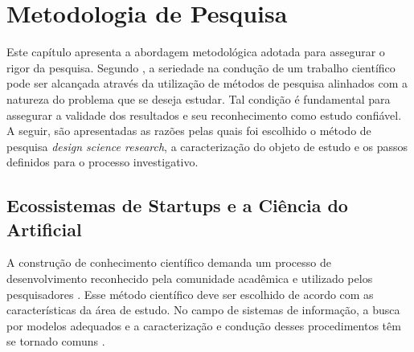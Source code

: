 \chapter{Metodologia de Pesquisa}\label{cap5}




Este capítulo apresenta a abordagem metodológica adotada para assegurar o rigor da pesquisa. Segundo , a seriedade na condução de um trabalho científico pode ser alcançada através da utilização de métodos de pesquisa alinhados com a natureza do problema que se deseja estudar. Tal condição é fundamental para assegurar a validade dos resultados e seu reconhecimento como estudo confiável. A seguir, são apresentadas as razões pelas quais foi escolhido o método de pesquisa \textit{design science research}, a caracterização do objeto de estudo e os passos definidos para o processo investigativo.

\section{Ecossistemas de Startups e a Ciência do Artificial}
A construção de conhecimento científico demanda um processo de desenvolvimento reconhecido pela comunidade acadêmica e utilizado pelos pesquisadores \cite{kuhn:2003}. Esse método científico deve ser escolhido de acordo com as características da área de estudo. No campo de sistemas de informação, a busca por modelos adequados e a caracterização e condução desses procedimentos têm se tornado comuns \cite{hevner-et-al-2004,peffers-et-al:2007,lee-et-al:2014}. 


